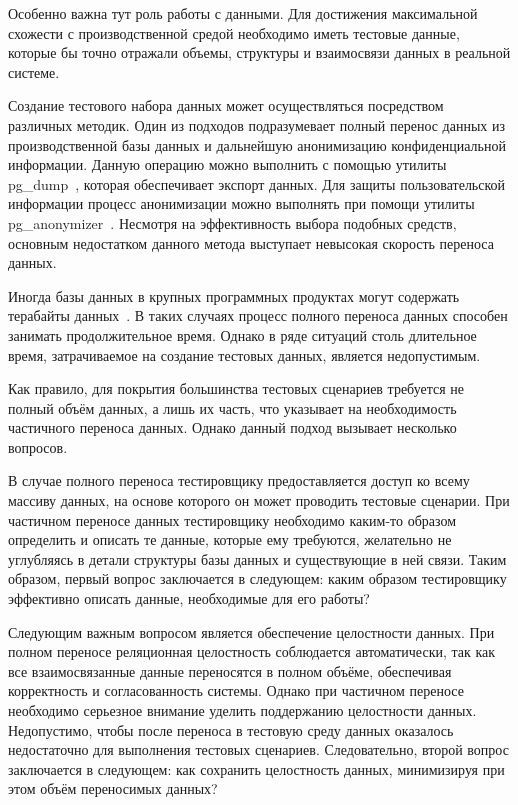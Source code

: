 Особенно важна тут роль работы с данными. Для достижения максимальной схожести с производственной средой необходимо иметь тестовые данные, которые бы точно отражали объемы, структуры и взаимосвязи данных в реальной системе.

Создание тестового набора данных может осуществляться посредством различных методик. Один из подходов подразумевает полный перенос данных из производственной базы данных и дальнейшую анонимизацию конфиденциальной информации. Данную операцию можно выполнить с помощью утилиты pg\_dump~\cite{pg-dump}, которая обеспечивает экспорт данных. Для защиты пользовательской информации процесс анонимизации можно выполнять при помощи утилиты pg\_anonymizer~\cite{pg-anonymizer}. Несмотря на эффективность выбора подобных средств, основным недостатком данного метода выступает невысокая скорость переноса данных.

Иногда базы данных в крупных программных продуктах могут содержать терабайты данных~\cite{pg-big-data-example}. В таких случаях процесс полного переноса данных способен занимать продолжительное время. Однако в ряде ситуаций столь длительное время, затрачиваемое на создание тестовых данных, является недопустимым.

Как правило, для покрытия большинства тестовых сценариев требуется не полный объём данных, а лишь их часть, что указывает на необходимость частичного переноса данных. Однако данный подход вызывает несколько вопросов.

В случае полного переноса тестировщику предоставляется доступ ко всему массиву данных, на основе которого он может проводить тестовые сценарии. При частичном переносе данных тестировщику необходимо каким-то образом определить и описать те данные, которые ему требуются, желательно не углубляясь в детали структуры базы данных и существующие в ней связи. Таким образом, первый вопрос заключается в следующем: каким образом тестировщику эффективно описать данные, необходимые для его работы?

Следующим важным вопросом является обеспечение целостности данных. При полном переносе реляционная целостность соблюдается автоматически, так как все взаимосвязанные данные переносятся в полном объёме, обеспечивая корректность и согласованность системы. Однако при частичном переносе необходимо серьезное внимание уделить поддержанию целостности данных. Недопустимо, чтобы после переноса в тестовую среду данных оказалось недостаточно для выполнения тестовых сценариев. Следовательно, второй вопрос заключается в следующем: как сохранить целостность данных, минимизируя при этом объём переносимых данных?

